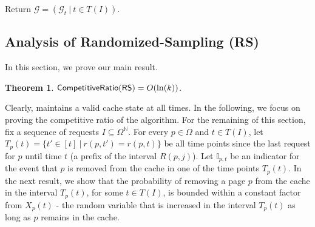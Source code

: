\documentclass[11pt]{article}
\newcommand{\op}{{\mathbb{I}_{p,t}}}
\newcommand{\cG}{{\mathcal{G}}}
\newcommand{\om}{{\Omega}}
\newtheorem{lemma}[thm]{Lemma}
\newtheorem{theorem}[thm]{Theorem}
\begin{document}
{\begin{algorithm}[h]
{{		}
		
	
		
	}
	
	Return $\cG = \left( \cG_t~|~t \in T(I) \right)$. 
\end{algorithm}



\subsection{Analysis of \textsf{Randomized-Sampling (RS)}}


 In this section, we prove our main result. 

\begin{theorem}
	\label{theorem:main}
	$\textnormal{\textsf{CompetitiveRatio}}(\textnormal{\textsf{RS}}) = O(\ln(k))$. 
\end{theorem}

Clearly,  maintains a valid cache state at all times. In the following, we focus on proving the competitive ratio of the algorithm.
For the remaining of this section, fix a sequence of requests $I \subseteq \om^{\mathbb{N}}$. For every $p \in \om$ and $t \in T(I)$, let $T_p(t) = \{t' \in [t]~|~r(p,t') = r(p,t)\}$ be all time points since the last request for $p$ until time $t$ (a prefix of the interval $R(p,j)$). Let $\op$ be an indicator for the event that $p$ is removed from the cache in one of the time points $T_p(t)$. %
%
%
%
%
In the next result, we show that the probability of removing a page $p$ from the cache in the interval $T_p(t)$, for some $t \in T(I)$, is bounded within a constant factor from $X_p(t)$ - the random variable that is increased in the interval $T_p(t)$ as long as $p$ remains in the cache. %


}
\end{document}
